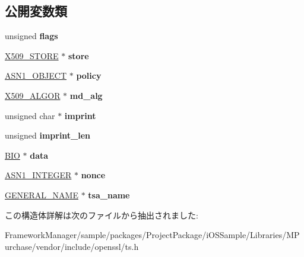 \subsection*{公開変数類}
\begin{DoxyCompactItemize}
\item 
\hypertarget{struct_t_s__verify__ctx_a5e906cf22084ef30d67bdb15df294480}{}unsigned {\bfseries flags}\label{struct_t_s__verify__ctx_a5e906cf22084ef30d67bdb15df294480}

\item 
\hypertarget{struct_t_s__verify__ctx_a9aa523132a1fc3f0c6f5330b524e177f}{}\hyperlink{structx509__store__st}{X509\+\_\+\+S\+T\+O\+R\+E} $\ast$ {\bfseries store}\label{struct_t_s__verify__ctx_a9aa523132a1fc3f0c6f5330b524e177f}

\item 
\hypertarget{struct_t_s__verify__ctx_ab433c7a76c0dd42e99eb654aa7c459fa}{}\hyperlink{structasn1__object__st}{A\+S\+N1\+\_\+\+O\+B\+J\+E\+C\+T} $\ast$ {\bfseries policy}\label{struct_t_s__verify__ctx_ab433c7a76c0dd42e99eb654aa7c459fa}

\item 
\hypertarget{struct_t_s__verify__ctx_a1875de1fef64a6d896f228badbdd2ddf}{}\hyperlink{struct_x509__algor__st}{X509\+\_\+\+A\+L\+G\+O\+R} $\ast$ {\bfseries md\+\_\+alg}\label{struct_t_s__verify__ctx_a1875de1fef64a6d896f228badbdd2ddf}

\item 
\hypertarget{struct_t_s__verify__ctx_a97e06ef1b0ab4490f7f50f06933c4187}{}unsigned char $\ast$ {\bfseries imprint}\label{struct_t_s__verify__ctx_a97e06ef1b0ab4490f7f50f06933c4187}

\item 
\hypertarget{struct_t_s__verify__ctx_a4b7cf5f0d8930796aeac6966712612bb}{}unsigned {\bfseries imprint\+\_\+len}\label{struct_t_s__verify__ctx_a4b7cf5f0d8930796aeac6966712612bb}

\item 
\hypertarget{struct_t_s__verify__ctx_a093f5641e9235cf8523d18b550bee7f4}{}\hyperlink{structbio__st}{B\+I\+O} $\ast$ {\bfseries data}\label{struct_t_s__verify__ctx_a093f5641e9235cf8523d18b550bee7f4}

\item 
\hypertarget{struct_t_s__verify__ctx_a3b3407367a1dd2b12053d527040b28a2}{}\hyperlink{structasn1__string__st}{A\+S\+N1\+\_\+\+I\+N\+T\+E\+G\+E\+R} $\ast$ {\bfseries nonce}\label{struct_t_s__verify__ctx_a3b3407367a1dd2b12053d527040b28a2}

\item 
\hypertarget{struct_t_s__verify__ctx_aa41f4334c8821a67eca400e955957f57}{}\hyperlink{struct_g_e_n_e_r_a_l___n_a_m_e__st}{G\+E\+N\+E\+R\+A\+L\+\_\+\+N\+A\+M\+E} $\ast$ {\bfseries tsa\+\_\+name}\label{struct_t_s__verify__ctx_aa41f4334c8821a67eca400e955957f57}

\end{DoxyCompactItemize}


この構造体詳解は次のファイルから抽出されました\+:\begin{DoxyCompactItemize}
\item 
Framework\+Manager/sample/packages/\+Project\+Package/i\+O\+S\+Sample/\+Libraries/\+M\+Purchase/vendor/include/openssl/ts.\+h\end{DoxyCompactItemize}
